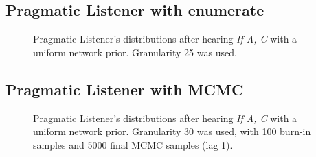 \documentclass[10pt,a4paper]{article}
\begin{document}
\subsection*{Pragmatic Listener with enumerate}
\begin{figure}[ht]
\centering
\subfloat[$P(C)$]{\label{fig:PL-PAgivenC}}\qquad
\subfloat[$P(C|A)$]{\label{fig:PL-PCgivenA}}\qquad
\subfloat[$P(A|C)$]{\label{fig:PL-PC}}\qquad
{}\qquad


\caption{Pragmatic Listener's distributions after hearing \textit{If A, C} with a uniform network prior. Granularity 25 was used.}
\label{fig:PL}
\end{figure}


\FloatBarrier
\subsection*{Pragmatic Listener with MCMC}
\begin{figure}[ht]
\centering
\subfloat[$P(C)$]{\label{fig:PL-mcmc-PAgivenC}}\qquad
\subfloat[$P(C|A)$]{\label{fig:PL-mcmc-PCgivenA}}\qquad

\subfloat[$P(A|C)$]{\label{fig:PL-mcmc-PC}}\qquad
\subfloat[$P(C|\neg A)$]{\label{fig:PL-mcmc-PC}}\qquad



\caption{Pragmatic Listener's distributions after hearing \textit{If A, C} with a uniform network prior. Granularity 30 was used, with 100 burn-in samples and 5000 final MCMC samples (lag 1).}
\label{fig:PL}
\end{figure}

\FloatBarrier
\end{document}
